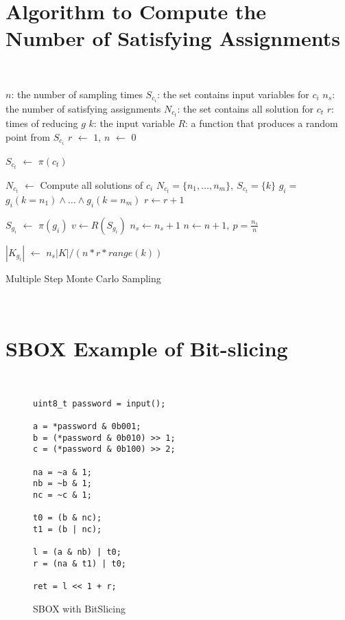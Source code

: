 \section{Algorithm to Compute the Number of Satisfying Assignments}
\label{appendix:montecarlo}
~
{\small
\IncMargin{1em}
\begin{algorithm}\small
    \SetAlgoLined
    \DontPrintSemicolon


    $n$: the number of sampling times \;
    $S_{c_i}$: the set contains input variables for $c_{i}$ \;
    $n_{s}$: the number of satisfying assignments \;
    $N_{c_t}$: the set contains all solution for $c_t$ \;
    $r$: times of reducing $g$\;
    $k$: the input variable \;
    $R$: a function that produces a random point from $S_{c_i}$\;
    $r$ $\leftarrow$ $1$,
    $n$ $\leftarrow$ $0$ \;
     {
        $S_{c_t}$ $\leftarrow$ $\pi(c_t)$ \;
        {
            $N_{c_t}$ $\leftarrow$ Compute all solutions of $c_i$ \;
            $N_{c_t} = \{n_1, \ldots, n_m\},\ S_{c_t} = \{k\}  $ \;
            $g_{i} = $ $g_i(k=n_1) \land \ldots \land g_i(k=n_m)$ \;
            $r \leftarrow r+1$ \;

        }
    }
     {
        $S_{g_i}$ $\leftarrow$ $\pi(g_i)$ \;
        $v \leftarrow R(S_{g_i})$ 
        {
           $n_s \leftarrow n_s + 1$
        }
        $n \leftarrow n +1,\ p = \frac{n_s}{n}$
    }

    $|K_{g_{i}}|$ $\leftarrow$ $n_s|K| / (n * r * range(k))$
    \caption{Multiple Step Monte Carlo Sampling}
\end{algorithm}
\DecMargin{1em}
}
~\vvv

\section{SBOX Example of Bit-slicing}
\label{appendix:SBOX}
~
\begin{figure}[h!]
    \centering
    \begin{lstlisting}[xleftmargin=.02\textwidth,xrightmargin=.01\textwidth]
uint8_t password = input();

a = *password & 0b001;
b = (*password & 0b010) >> 1;
c = (*password & 0b100) >> 2;

na = ~a & 1;
nb = ~b & 1;
nc = ~c & 1;

t0 = (b & nc);
t1 = (b | nc);

l = (a & nb) | t0;
r = (na & t1) | t0;

ret = l << 1 + r;
      \end{lstlisting}
    \caption{SBOX with BitSlicing}
    \label{fig:SBOX_bitslicing}
\end{figure}

